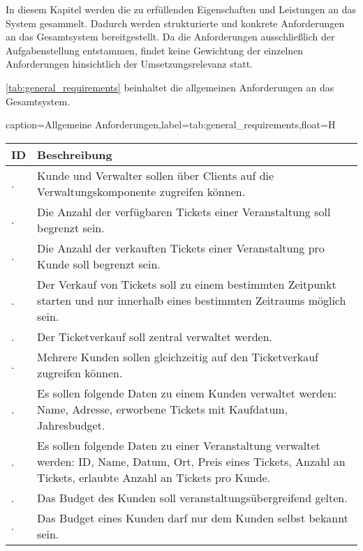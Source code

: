 In diesem Kapitel werden die zu erfüllenden Eigenschaften und Leistungen an das System gesammelt. Dadurch werden strukturierte und konkrete Anforderungen an das Gesamtsystem bereitgestellt.
Da die Anforderungen ausschließlich der Aufgabenstellung entstammen, findet keine Gewichtung der einzelnen Anforderungen hinsichtlich der Umsetzungsrelevanz statt.

\autoref{tab:general_requirements} beinhaltet die allgemeinen Anforderungen an das Gesamtsystem.

\newcommand\inctablenumber{\stepcounter{tablenumber}}
\newcommand\tablenumber{\arabic{tablenumber}}
\newcommand\incrownumber{\stepcounter{rownumber}}
\newcommand\rownumber{\arabic{rownumber}}
\setcounter{tablenumber}{1}
\setcounter{rownumber}{1}
\begin{dhbwtable}{caption={Allgemeine Anforderungen},label=tab:general_requirements,float=H}
    \begin{tabularx}{\textwidth}{l | X}
        \toprule
        \textbf{ID} & \textbf{Beschreibung}  \\\midrule
        \tablenumber .\rownumber & Kunde und Verwalter sollen über Clients auf die Verwaltungskomponente zugreifen können. \\\midrule\incrownumber
        \tablenumber .\rownumber & Die Anzahl der verfügbaren Tickets einer Veranstaltung soll begrenzt sein. \\\midrule\incrownumber
        \tablenumber .\rownumber & Die Anzahl der verkauften Tickets einer Veranstaltung pro Kunde soll begrenzt sein. \\\midrule\incrownumber
        \tablenumber .\rownumber & Der Verkauf von Tickets soll zu einem bestimmten Zeitpunkt starten und nur innerhalb eines bestimmten Zeitraums möglich sein. \\\midrule\incrownumber
        \tablenumber .\rownumber & Der Ticketverkauf soll zentral verwaltet werden. \\\midrule\incrownumber
        \tablenumber .\rownumber & Mehrere Kunden sollen gleichzeitig auf den Ticketverkauf zugreifen können. \\\midrule\incrownumber
        \tablenumber .\rownumber & Es sollen folgende Daten zu einem Kunden verwaltet werden: Name, Adresse, erworbene Tickets mit Kaufdatum, Jahresbudget. \\\midrule\incrownumber
        \tablenumber .\rownumber & Es sollen folgende Daten zu einer Veranstaltung verwaltet werden: ID, Name, Datum, Ort, Preis eines Tickets, Anzahl an Tickets, erlaubte Anzahl an Tickets pro Kunde. \\\midrule\incrownumber
        \tablenumber .\rownumber & Das Budget des Kunden soll veranstaltungsübergreifend gelten. \\\midrule\incrownumber
        \tablenumber .\rownumber & Das Budget eines Kunden darf nur dem Kunden selbst bekannt sein.  \\\bottomrule
    \end{tabularx}    
\end{dhbwtable}

